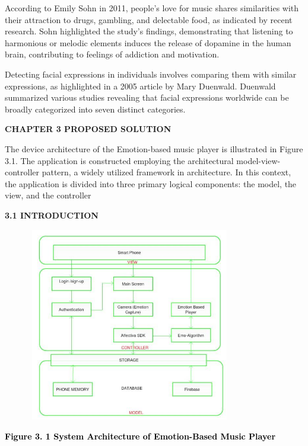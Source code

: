 \documentclass[a4paper]{article}
\begin{document}
According to Emily Sohn in 2011, people's love for music shares similarities with their attraction to drugs, gambling,
and delectable food, as indicated by recent research. Sohn highlighted the study's findings, demonstrating that
listening to harmonious or melodic elements induces the release of dopamine in the human brain, contributing to
feelings of addiction and motivation.

Detecting facial expressions in individuals involves comparing them with similar expressions, as highlighted in a 2005
article by Mary Duenwald. Duenwald summarized various studies revealing that facial expressions worldwide can be
broadly categorized into seven distinct categories.\textbf{ }

\clearpage\setcounter{page}{1}\pagestyle{Convertedviii}
{\bfseries
\hypertarget{2s8eyo1}{}CHAPTER 3 PROPOSED SOLUTION }

The device architecture of the Emotion-based music player is illustrated in Figure 3.1. The application is constructed
employing the architectural model-view-controller pattern, a widely utilized framework in architecture. In this
context, the application is divided into three primary logical components: the model, the view, and the controller


\bigskip

{\bfseries
\hypertarget{17dp8vu}{}3.1 INTRODUCTION\ \ }

{\centering  \includegraphics[width=4.3811in,height=3.3437in]{rahulop-img004.jpg} \par}
{\centering
\hypertarget{3rdcrjn}{}\textbf{\textcolor{black}{Figure 3. 1 System Architecture of Emotion-Based Music Player}}
\par}


\bigskip
\end{document}
